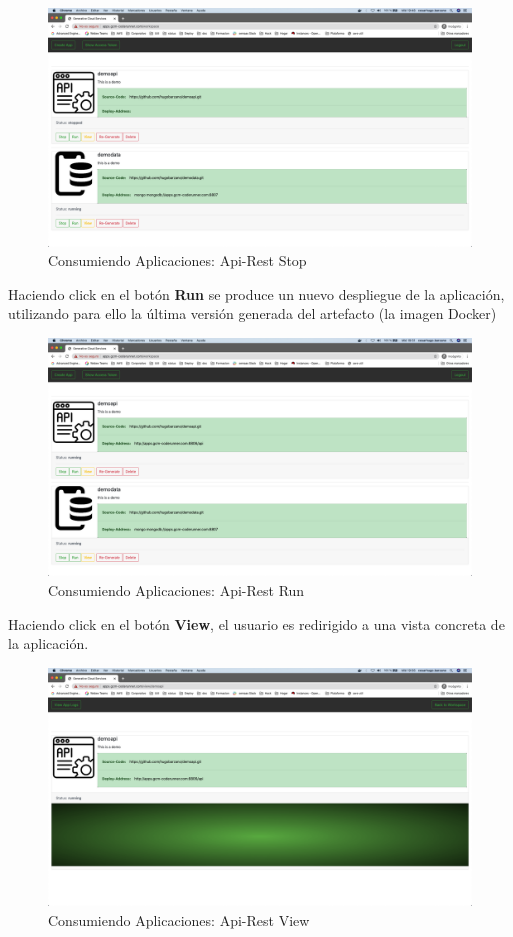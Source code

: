 \documentclass[a4paper,11pt]{book}
\begin{document}
\begin{figure}[H]
\centering
\includegraphics[scale=0.2]{imagenes/casouso/1_3.png}
\caption{  Consumiendo Aplicaciones: Api-Rest  Stop}
\end{figure}

Haciendo click en el botón \textbf{Run} se produce un nuevo despliegue de la aplicación, utilizando para ello la última versión generada del artefacto (la imagen Docker) 


\begin{figure}[H]
\centering
\includegraphics[scale=0.2]{imagenes/casouso/1_4.png}
\caption{ Consumiendo Aplicaciones: Api-Rest Run  }
\end{figure}


Haciendo click en el botón \textbf{View}, el usuario es redirigido a una vista concreta de la aplicación. 

\begin{figure}[H]
\centering
\includegraphics[scale=0.2]{imagenes/casouso/1_5.png}
\caption{ Consumiendo Aplicaciones: Api-Rest View   }
\end{figure}
\end{document}
